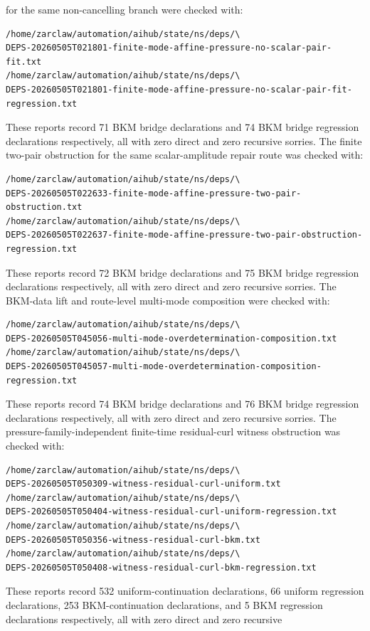 \documentclass[11pt]{article}
\begin{document}
for the same non-cancelling branch were checked with:
\begin{verbatim}
/home/zarclaw/automation/aihub/state/ns/deps/\
DEPS-20260505T021801-finite-mode-affine-pressure-no-scalar-pair-fit.txt
/home/zarclaw/automation/aihub/state/ns/deps/\
DEPS-20260505T021801-finite-mode-affine-pressure-no-scalar-pair-fit-regression.txt
\end{verbatim}
These reports record 71 BKM bridge declarations and 74 BKM bridge regression
declarations respectively, all with zero direct and zero recursive sorries.
The finite two-pair obstruction for the same scalar-amplitude repair route was
checked with:
\begin{verbatim}
/home/zarclaw/automation/aihub/state/ns/deps/\
DEPS-20260505T022633-finite-mode-affine-pressure-two-pair-obstruction.txt
/home/zarclaw/automation/aihub/state/ns/deps/\
DEPS-20260505T022637-finite-mode-affine-pressure-two-pair-obstruction-regression.txt
\end{verbatim}
These reports record 72 BKM bridge declarations and 75 BKM bridge regression
declarations respectively, all with zero direct and zero recursive sorries.
The BKM-data lift and route-level multi-mode composition were checked with:
\begin{verbatim}
/home/zarclaw/automation/aihub/state/ns/deps/\
DEPS-20260505T045056-multi-mode-overdetermination-composition.txt
/home/zarclaw/automation/aihub/state/ns/deps/\
DEPS-20260505T045057-multi-mode-overdetermination-composition-regression.txt
\end{verbatim}
These reports record 74 BKM bridge declarations and 76 BKM bridge regression
declarations respectively, all with zero direct and zero recursive sorries.
The pressure-family-independent finite-time residual-curl witness obstruction
was checked with:
\begin{verbatim}
/home/zarclaw/automation/aihub/state/ns/deps/\
DEPS-20260505T050309-witness-residual-curl-uniform.txt
/home/zarclaw/automation/aihub/state/ns/deps/\
DEPS-20260505T050404-witness-residual-curl-uniform-regression.txt
/home/zarclaw/automation/aihub/state/ns/deps/\
DEPS-20260505T050356-witness-residual-curl-bkm.txt
/home/zarclaw/automation/aihub/state/ns/deps/\
DEPS-20260505T050408-witness-residual-curl-bkm-regression.txt
\end{verbatim}
These reports record 532 uniform-continuation declarations, 66 uniform
regression declarations, 253 BKM-continuation declarations, and 5 BKM
regression declarations respectively, all with zero direct and zero recursive
\end{document}
